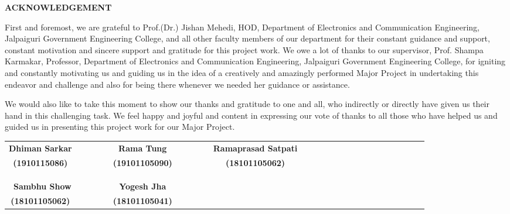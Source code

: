 
\begin{center}
\textbf{ACKNOWLEDGEMENT}
\end{center}


First and foremost, we are grateful to Prof.(Dr.) Jishan Mehedi, HOD, Department of Electronics and Communication Engineering, Jalpaiguri Government Engineering College, and all other faculty members of our department for their constant guidance and support, constant motivation and sincere support and gratitude for this project work. We owe a lot of thanks to our supervisor, Prof. Shampa Karmakar, Professor, Department of Electronics and Communication Engineering, Jalpaiguri Government Engineering College, for igniting and constantly motivating us and guiding us in the idea of a creatively and amazingly performed Major Project in undertaking this endeavor and challenge and also for being there whenever we needed her guidance or assistance.

We would also like to take this moment to show our thanks and gratitude to one and all, who indirectly or directly have given us their hand in this challenging task. We feel happy and joyful and content in expressing our vote of thanks to all those who have helped us and guided us in presenting this project work for our Major Project.

\vspace{3cm}


\begin{tabular} {c c c c c c c c c c c c c c c c c c c c c c c c c c }
	\textbf{Dhiman Sarkar} &&&&& \textbf{Rama Tung}  &&&&& \textbf{Ramaprasad Satpati}\\
	\textbf{(1910115086)}    &&&&& \textbf{(19101105090)} &&&&& \textbf{(18101105062)} \\\\\\\\\
	\textbf{Sambhu Show}        &&&&& \textbf{Yogesh Jha}\\
	 \textbf{(18101105062)}   &&&&&  \textbf{(18101105041)}
\end{tabular}
